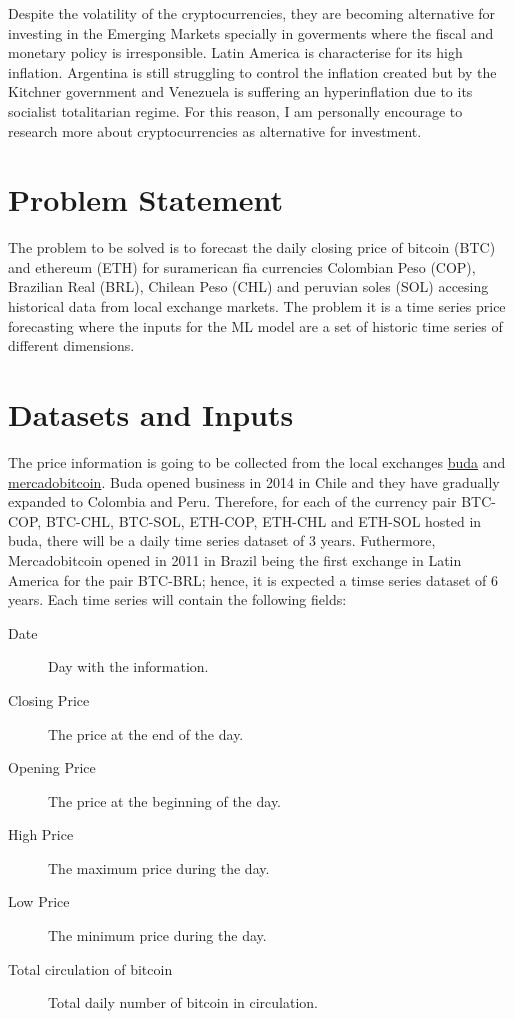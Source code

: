 \documentclass{article}
\begin{document}
Despite the volatility of the cryptocurrencies, they are becoming alternative for investing in the Emerging Markets specially in goverments where the fiscal and monetary policy  is irresponsible. Latin America is characterise for its high inflation. Argentina is still struggling to control the inflation created but by the Kitchner government and Venezuela is suffering an hyperinflation due to its socialist totalitarian regime. For this reason, I am personally encourage to research more about cryptocurrencies as alternative for investment.

\section{Problem Statement} \label{problem}

The problem to be solved is to forecast the daily closing price of bitcoin (BTC) and  ethereum (ETH) for suramerican fia currencies Colombian Peso (COP), Brazilian Real (BRL), Chilean Peso (CHL) and peruvian soles (SOL) accesing historical data from local exchange markets. The problem it is a time series price forecasting where the inputs for the ML model are a set of historic time series of different dimensions.


\section{Datasets and Inputs} \label{datasets}

The price information is going to be collected from the local exchanges \href{https://api.buda.com}{buda} and \href{https://www.mercadobitcoin.com.br/api-doc/}{mercadobitcoin}. Buda opened business in 2014 in Chile and  they have gradually expanded to Colombia and Peru. Therefore, for each of the currency pair BTC-COP, BTC-CHL, BTC-SOL, ETH-COP, ETH-CHL and ETH-SOL hosted in buda, there will be a daily time series dataset of 3 years. Futhermore, Mercadobitcoin opened in 2011 in Brazil being the first exchange in Latin America for the pair BTC-BRL; hence, it is expected a timse series dataset of 6 years. Each time series will contain the following fields:

\begin{description}
\item[Date] Day with the information.
\item[Closing Price] The price at the end of the day.
\item[Opening Price] The price at the beginning of the day.
\item[High Price] The maximum price during the day.
\item[Low Price] The minimum price during the day.
\item[Total circulation of bitcoin] Total daily number of bitcoin in circulation.
\end{description}
\end{document}

